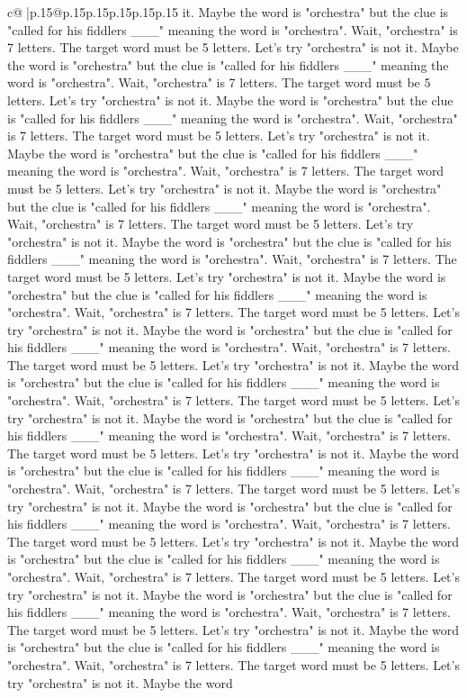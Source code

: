 \documentclass{article}
\begin{document}
{\begin{supertabular}{c@{$\;$}|p{.15\linewidth}@{}p{.15\linewidth}p{.15\linewidth}p{.15\linewidth}p{.15\linewidth}p{.15\linewidth}}
{{{it. Maybe the word is "orchestra" but the clue is "called for his fiddlers \_\_\_" meaning the word is "orchestra". Wait, "orchestra" is 7 letters. The target word must be 5 letters. Let's try "orchestra" is not it. Maybe the word is "orchestra" but the clue is "called for his fiddlers \_\_\_" meaning the word is "orchestra". Wait, "orchestra" is 7 letters. The target word must be 5 letters. Let's try "orchestra" is not it. Maybe the word is "orchestra" but the clue is "called for his fiddlers \_\_\_" meaning the word is "orchestra". Wait, "orchestra" is 7 letters. The target word must be 5 letters. Let's try "orchestra" is not it. Maybe the word is "orchestra" but the clue is "called for his fiddlers \_\_\_" meaning the word is "orchestra". Wait, "orchestra" is 7 letters. The target word must be 5 letters. Let's try "orchestra" is not it. Maybe the word is "orchestra" but the clue is "called for his fiddlers \_\_\_" meaning the word is "orchestra". Wait, "orchestra" is 7 letters. The target word must be 5 letters. Let's try "orchestra" is not it. Maybe the word is "orchestra" but the clue is "called for his fiddlers \_\_\_" meaning the word is "orchestra". Wait, "orchestra" is 7 letters. The target word must be 5 letters. Let's try "orchestra" is not it. Maybe the word is "orchestra" but the clue is "called for his fiddlers \_\_\_" meaning the word is "orchestra". Wait, "orchestra" is 7 letters. The target word must be 5 letters. Let's try "orchestra" is not it. Maybe the word is "orchestra" but the clue is "called for his fiddlers \_\_\_" meaning the word is "orchestra". Wait, "orchestra" is 7 letters. The target word must be 5 letters. Let's try "orchestra" is not it. Maybe the word is "orchestra" but the clue is "called for his fiddlers \_\_\_" meaning the word is "orchestra". Wait, "orchestra" is 7 letters. The target word must be 5 letters. Let's try "orchestra" is not it. Maybe the word is "orchestra" but the clue is "called for his fiddlers \_\_\_" meaning the word is "orchestra". Wait, "orchestra" is 7 letters. The target word must be 5 letters. Let's try "orchestra" is not it. Maybe the word is "orchestra" but the clue is "called for his fiddlers \_\_\_" meaning the word is "orchestra". Wait, "orchestra" is 7 letters. The target word must be 5 letters. Let's try "orchestra" is not it. Maybe the word is "orchestra" but the clue is "called for his fiddlers \_\_\_" meaning the word is "orchestra". Wait, "orchestra" is 7 letters. The target word must be 5 letters. Let's try "orchestra" is not it. Maybe the word is "orchestra" but the clue is "called for his fiddlers \_\_\_" meaning the word is "orchestra". Wait, "orchestra" is 7 letters. The target word must be 5 letters. Let's try "orchestra" is not it. Maybe the word is "orchestra" but the clue is "called for his fiddlers \_\_\_" meaning the word is "orchestra". Wait, "orchestra" is 7 letters. The target word must be 5 letters. Let's try "orchestra" is not it. Maybe the word is "orchestra" but the clue is "called for his fiddlers \_\_\_" meaning the word is "orchestra". Wait, "orchestra" is 7 letters. The target word must be 5 letters. Let's try "orchestra" is not it. Maybe the word }}}
\end{supertabular}}
\end{document}

